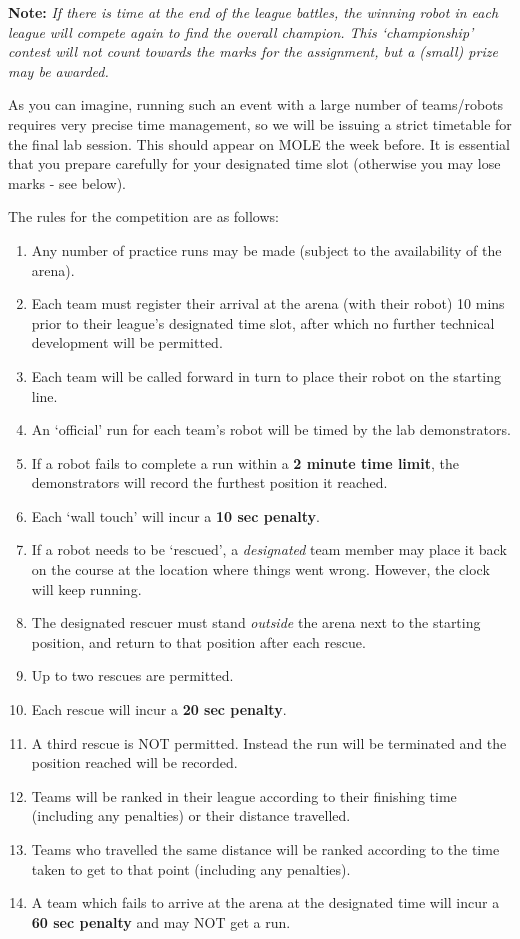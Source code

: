 \documentclass[hidelinks,a4paper,11pt]{article}
\begin{document}
{\bfseries Note:}  \emph{If there is time at the end of the league battles, the winning robot in each league will compete again to find the overall champion.  This `championship' contest will not count towards the marks for the assignment, but a (small) prize may be awarded.}

As you can imagine, running such an event with a large number of teams/robots requires very precise time management, so we will be issuing a strict timetable for the final lab session.  This should appear on MOLE the week before.  It is essential that you prepare carefully for your designated time slot (otherwise you may lose marks - see below).

The rules for the competition are as follows:
\begin{enumerate}
	\item Any number of practice runs may be made (subject to the availability of the arena).
	\item Each team must register their arrival at the arena (with their robot) 10 mins prior to their league's designated time slot, after which no further technical development will be permitted.
	\item Each team will be called forward in turn to place their robot on the starting line.
	\item An `official' run for each team's robot will be timed by the lab demonstrators.
	\item If a robot fails to complete a run within a \textbf{2 minute time limit}, the demonstrators will record the furthest position it reached.
	\item Each `wall touch' will incur a \textbf{10 sec penalty}.
	\item If a robot needs to be `rescued', a \emph{designated} team member may place it back on the course at the location where things went wrong.  However, the clock will keep running.
	\item The designated rescuer must stand \emph{outside} the arena next to the starting position, and return to that position after each rescue.
	\item Up to two rescues are permitted.
	\item Each rescue will incur a \textbf{20 sec penalty}.
	\item A third rescue is NOT permitted.  Instead the run will be terminated and the position reached will be recorded.
	\item Teams will be ranked in their league according to their finishing time (including any penalties) or their distance travelled.
	\item Teams who travelled the same distance will be ranked according to the time taken to get to that point (including any penalties).
	\item A team which fails to arrive at the arena at the designated time will incur a \textbf{60 sec penalty} and may NOT get a run.
\end{enumerate}
	
\end{document}
